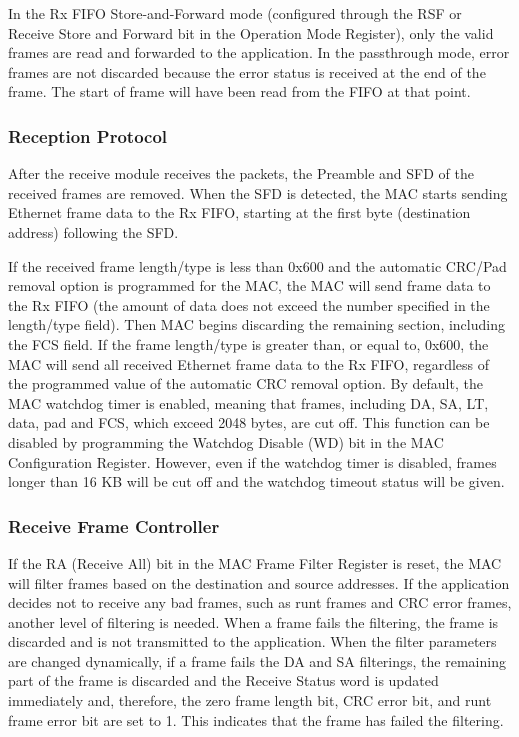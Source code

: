 \documentclass[main\_\_EN.tex]{subfiles}
\begin{document}
In the Rx FIFO Store-and-Forward mode (configured through the RSF or Receive Store and Forward bit in the Operation Mode Register), only the valid frames are read and forwarded to the application. In the passthrough mode, error frames are not discarded because the error status is received at the end of the frame. The start of frame will have been read from the FIFO at that point.

\subsubsection{Reception Protocol}
After the receive module receives the packets, the Preamble and SFD of the received frames are removed. When the SFD is detected, the MAC starts sending Ethernet frame data to the Rx FIFO, starting at the first byte (destination address) following the SFD. 

If the received frame length/type is less than 0x600 and the automatic CRC/Pad removal option is programmed for the MAC, the MAC will send frame data to the Rx FIFO (the amount of data does not exceed the number specified in the length/type field). Then MAC begins discarding the remaining section, including the FCS field. If the frame length/type is greater than, or equal to, 0x600, the MAC will send all received Ethernet frame data to the Rx FIFO, regardless of the programmed value of the automatic CRC removal option. By default, the MAC watchdog timer is enabled, meaning that frames, including DA, SA, LT, data, pad and FCS, which exceed 2048 bytes, are cut off. This function can be disabled by programming the Watchdog Disable (WD) bit in the MAC Configuration Register. However, even if the watchdog timer is disabled, frames longer than 16 KB will be cut off and the watchdog timeout status will be given.

\subsubsection{Receive Frame Controller}
If the RA (Receive All) bit in the MAC Frame Filter Register is reset, the MAC will filter frames based on the destination and source addresses. If the application decides not to receive any bad frames, such as runt frames and CRC error frames, another level of filtering is needed. When a frame fails the filtering, the frame is discarded and is not transmitted to the application. When the filter parameters are changed dynamically, if a frame fails the DA and SA filterings, the remaining part of the frame is discarded and the Receive Status word is updated immediately and, therefore, the zero frame length bit, CRC error bit, and runt frame error bit are set to 1. This indicates that the frame has failed the filtering.
\end{document}
